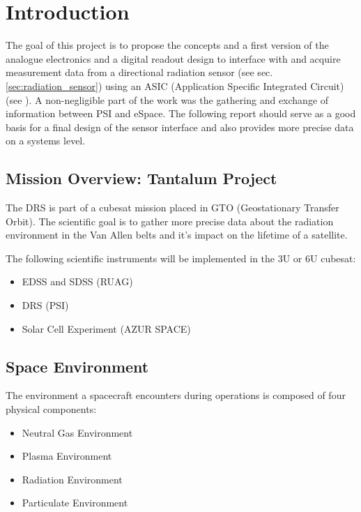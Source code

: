 \section{Introduction}
\label{sec:introduction}

The goal of this project is to propose the concepts and a first version of the analogue electronics and a digital readout design to interface with and acquire measurement data from a directional radiation sensor (see sec. \ref{sec:radiation_sensor}) using an ASIC (Application Specific Integrated Circuit) (see \cite{Meier2016VATA466}).
A non-negligible part of the work was the gathering and exchange of information between PSI and eSpace.
The following report should serve as a good basis for a final design of the sensor interface and also provides more precise data on a systems level.

\subsection{Mission Overview: Tantalum Project}
\label{sec:mission_overview}
The DRS is part of a cubesat mission placed in GTO (Geostationary Transfer Orbit).
The scientific goal is to gather more precise data about the radiation environment in the Van Allen belts and it's impact on the lifetime of a satellite.

The following scientific instruments will be implemented in the 3U or 6U cubesat:\cite{tantalumproject2016}
\begin{itemize}
	\item EDSS and SDSS (RUAG)
	\item DRS (PSI)
	\item Solar Cell Experiment (AZUR SPACE)
\end{itemize}


\subsection{Space Environment}
\label{sec:space_environment}
The environment a spacecraft encounters during operations is composed of four physical components:\cite{hastings2004spacecraft}
\begin{itemize}
	\item Neutral Gas Environment
	\item Plasma Environment
	\item Radiation Environment
	\item Particulate Environment
\end{itemize}

